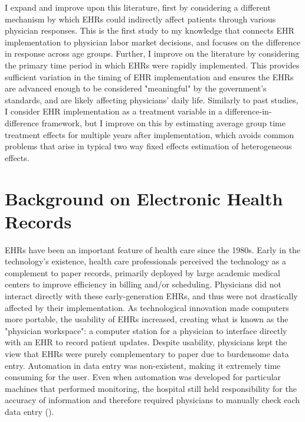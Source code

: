 \documentclass[11pt]{article}
\begin{document}
I expand and improve upon this literature, first by considering a different mechanism by which EHRs could indirectly affect patients through various physician responses. This is the first study to my knowledge that connects EHR implementation to physician labor market decisions, and focuses on the difference in response across age groups. Further, I improve on the literature by considering the primary time period in which EHRs were rapidly implemented. This provides sufficient variation in the timing of EHR implementation and ensures the EHRs are advanced enough to be considered "meaningful" by the government's standards, and are likely affecting physicians' daily life. Similarly to past studies, I consider EHR implementation as a treatment variable in a difference-in-difference framework, but I improve on this by estimating average group time treatment effects for multiple years after implementation, which avoids common problems that arise in typical two way fixed effects estimation of heterogeneous effects.  




\section{Background on Electronic Health Records}

EHRs have been an important feature of health care since the 1980s. Early in the technology's existence, health care professionals perceived the technology as a complement to paper records, primarily deployed by large academic medical centers to improve efficiency in billing and/or scheduling. Physicians did not interact directly with these early-generation EHRs, and thus were not drastically affected by their implementation. As technological innovation made computers more portable, the usability of EHRs increased, creating what is known as the "physician workspace": a computer station for a physician to interface directly with an EHR to record patient updates. Despite usability, physicians kept the view that EHRs were purely complementary to paper due to burdensome data entry. Automation in data entry was non-existent, making it extremely time consuming for the user. Even when automation was developed for particular machines that performed monitoring, the hospital still held responsibility for the accuracy of information and therefore required physicians to manually check each data entry (\cite{evans2016electronic}). 
\end{document}
